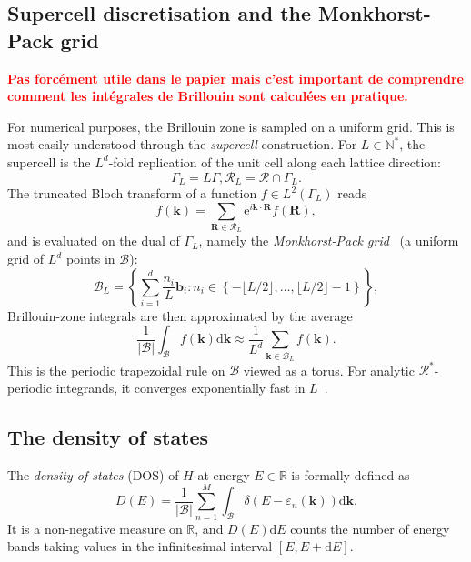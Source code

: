 \documentclass[11pt]{article}
\numberwithin{equation}{section}
\begin{document}
\subsection{Supercell discretisation and the Monkhorst-Pack grid}\label{sec:supercell}
\textcolor{red}{\textbf{Pas forcément utile dans le papier mais c'est important de
        comprendre comment les intégrales de Brillouin sont calculées en pratique.}}

For numerical purposes, the Brillouin zone is sampled on a uniform grid. This is most
easily understood through the \emph{supercell} construction. For \(L \in \mathbb{N}^*\),
the supercell is the \(L^d\)-fold replication of the unit cell along each lattice
direction:
\begin{equation}
    \Gamma_L = L \Gamma,
    \mathcal{R}_L = \mathcal{R} \cap \Gamma_L.
\end{equation}
The truncated Bloch transform of a function \(f \in L^2(\Gamma_L)\) reads
\begin{equation}
    f(\mathbf{k}) = \sum_{\mathbf{R} \in \mathcal{R}_L}
    \mathrm{e}^{i\mathbf{k}\cdot\mathbf{R}} f(\mathbf{R}),
\end{equation}
and is evaluated on the dual of \(\Gamma_L\), namely the \emph{Monkhorst-Pack
    grid}~\cite{monkhorst1976special} (a uniform grid of \(L^d\) points in
\(\mathcal{B}\)):
\begin{equation}
    \mathcal{B}_L = \left\{ \sum_{i=1}^d \frac{n_i}{L}\mathbf{b}_i :
    n_i \in \left\{-\lfloor L/2\rfloor, \dots, \lfloor L/2\rfloor - 1\right\}
    \right\},
\end{equation}
Brillouin-zone integrals are then approximated by the average
\begin{equation}
    \frac{1}{|\mathcal{B}|} \int_\mathcal{B} f(\mathbf{k})\mathrm{d}\mathbf{k}
    \approx \frac{1}{L^d} \sum_{\mathbf{k} \in \mathcal{B}_L} f(\mathbf{k}).
    \label{eq:ptr}
\end{equation}
This is the periodic trapezoidal rule on \(\mathcal{B}\) viewed as a torus. For analytic
\(\mathcal{R}^*\)-periodic integrands, it converges exponentially fast in
\(L\)~\cite{trefethen2014exponentially}.

\subsection{The density of states}\label{sec:dos}

The \emph{density of states} (DOS) of \(H\) at energy \(E \in \mathbb{R}\) is formally
defined as
\begin{equation}
    D(E) = \frac{1}{|\mathcal{B}|} \sum_{n=1}^M
    \int_\mathcal{B} \delta(E - \varepsilon_n(\mathbf{k}))
    \mathrm{d}\mathbf{k}.
    \label{eq:dos}
\end{equation}
It is a non-negative measure on \(\mathbb{R}\), and \(D(E)\mathrm{d}E\) counts the number
of energy bands taking values in the infinitesimal interval \([E, E + \mathrm{d}E]\).
\end{document}
